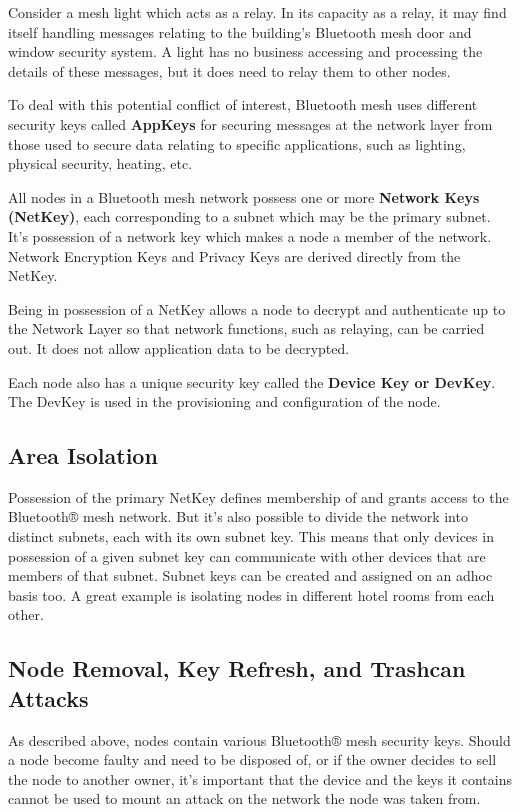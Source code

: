 \documentclass[\main/main.tex]{subfiles}
\begin{document}
Consider a mesh light which acts as a relay. In its capacity as a relay, it may find itself handling messages relating to the building’s Bluetooth mesh door and window security system. A light has no business accessing and processing the details of these messages, but it does need to relay them to other nodes.

To deal with this potential conflict of interest, Bluetooth mesh uses different security keys called \textbf{AppKeys} for securing messages at the network layer from those used to secure data relating to specific applications, such as lighting, physical security, heating, etc.

All nodes in a Bluetooth mesh network possess one or more \textbf{Network Keys (NetKey)}, each corresponding to a subnet which may be the primary subnet. It’s possession of a network key which makes a node a member of the network. Network Encryption Keys and Privacy Keys are derived directly from the NetKey.

Being in possession of a NetKey allows a node to decrypt and authenticate up to the Network Layer so that network functions, such as relaying, can be carried out. It does not allow application data to be decrypted.

Each node also has a unique security key called the \textbf{Device Key or DevKey}. The DevKey is used in the provisioning and configuration of the node.

\subsection{Area Isolation}
Possession of the primary NetKey defines membership of and grants access to the Bluetooth® mesh network. But it’s also possible to divide the network into distinct subnets, each with its own subnet key. This means that only devices in possession of a given subnet key can communicate with other devices that are members of that subnet. Subnet keys can be created and assigned on an adhoc basis too. A great example is isolating nodes in different hotel rooms from each other.

\subsection{Node Removal, Key Refresh, and Trashcan Attacks}
As described above, nodes contain various Bluetooth® mesh security keys. Should a node become faulty and need to be disposed of, or if the owner decides to sell the node to another owner, it’s important that the device and the keys it contains cannot be used to mount an attack on the network the node was taken from.
\end{document}
